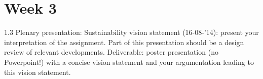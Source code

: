 \documentclass[final]{scrreprt} %
\begin{document}
\chapter{Week 3}
1.3 Plenary presentation: Sustainability vision statement (16-08-’14): present your 
interpretation of the assignment. Part of this presentation should be a design 
review of relevant developments. Deliverable: poster presentation (no 
Powerpoint!) with a concise vision statement and your argumentation leading 
to this vision statement. 
\end{document}
